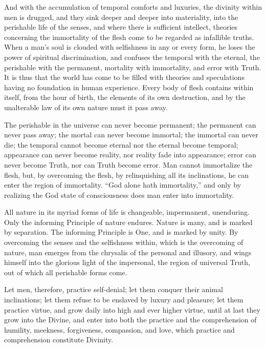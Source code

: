 \documentclass[12pt,oneside]{scrbook}
\begin{document}
  And with the accumulation of temporal comforts and luxuries, the
  divinity within men is drugged, and they sink deeper and deeper into
  materiality, into the perishable life of the senses, and where there is
  sufficient intellect, theories concerning the immortality of the flesh
  come to be regarded as infallible truths. When a man's soul is clouded
  with selfishness in any or every form, he loses the power of spiritual
  discrimination, and confuses the temporal with the eternal, the
  perishable with the permanent, mortality with immortality, and error
  with Truth. It is thus that the world has come to be filled with
  theories and speculations having no foundation in human experience.
  Every body of flesh contains within itself, from the hour of birth, the
  elements of its own destruction, and by the unalterable law of its own
  nature must it pass away.
  
  The perishable in the universe can never become permanent; the permanent
  can never pass away; the mortal can never become immortal; the immortal
  can never die; the temporal cannot become eternal nor the eternal become
  temporal; appearance can never become reality, nor reality fade into
  appearance; error can never become Truth, nor can Truth become error.
  Man cannot immortalize the flesh, but, by overcoming the flesh, by
  relinquishing all its inclinations, he can enter the region of
  immortality. ``God alone hath immortality,'' and only by realizing the
  God state of consciousness does man enter into immortality.
  
  All nature in its myriad forms of life is changeable, impermanent,
  unenduring. Only the informing Principle of nature endures. Nature is
  many, and is marked by separation. The informing Principle is One, and
  is marked by unity. By overcoming the senses and the selfishness within,
  which is the overcoming of nature, man emerges from the chrysalis of the
  personal and illusory, and wings himself into the glorious light of the
  impersonal, the region of universal Truth, out of which all perishable
  forms come.
  
  Let men, therefore, practice self-denial; let them conquer their animal
  inclinations; let them refuse to be enslaved by luxury and pleasure; let
  them practice virtue, and grow daily into high and ever higher virtue,
  until at last they grow into the Divine, and enter into both the
  practice and the comprehension of humility, meekness, forgiveness,
  compassion, and love, which practice and comprehension constitute
  Divinity.
  
\end{document}
